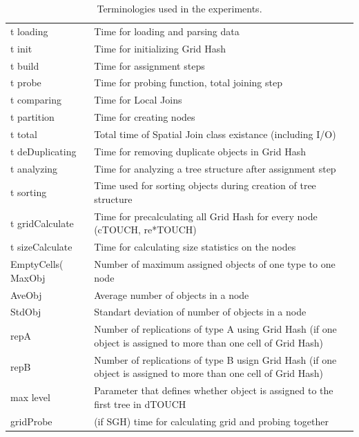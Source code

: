 \documentclass{sig-alternate}
\begin{document}
\begin{table}
\begin{tabular}{ |l|l| }
t loading	& Time for loading and parsing data\\
t init		& Time for initializing Grid Hash\\
t build		& Time for assignment steps\\
t probe		& Time for probing function, total joining step\\
t comparing	& Time for Local Joins\\
t partition	& Time for creating nodes\\
t total		& Total time of Spatial Join class existance (including I/O)\\
t deDuplicating	& Time for removing duplicate objects in Grid Hash\\
t analyzing	& Time for analyzing a tree structure after assignment step\\
t sorting	& Time used for sorting objects during creation of tree structure\\
t gridCalculate	& Time for precalculating all Grid Hash for every node (cTOUCH, re*TOUCH)\\
t sizeCalculate	& Time for calculating size statistics on the nodes\\
EmptyCells(%
MaxObj		& Number of maximum assigned objects of one type to one node\\
AveObj		& Average number of objects in a node \\
StdObj		& Standart deviation of number of objects in a node \\
repA		& Number of replications of type A using Grid Hash (if one object is assigned to more than one cell of Grid Hash)\\
repB		& Number of replications of type B usign Grid Hash (if one object is assigned to more than one cell of Grid Hash)\\
max level   & Parameter that defines whether object is assigned to the first tree in dTOUCH\\
gridProbe   & (if SGH) time for calculating grid and probing together\\

  \hline
\end{tabular}
\caption{Terminologies used in the experiments.}
\label{table:terms}
\end{table}
\end{document}
